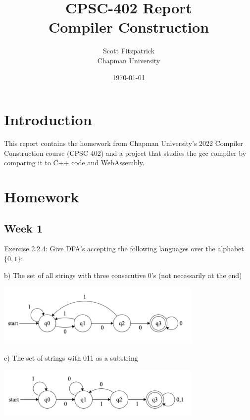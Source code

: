 \documentclass{article}
\title{CPSC-402 Report\\Compiler Construction}
\author{Scott Fitzpatrick  \\ Chapman University}
\date{\today}
\theoremstyle{theorem}
\theoremstyle{definition}
\theoremstyle{remark}
\begin{document}
\maketitle

\begin{abstract}

\end{abstract}

\tableofcontents


\section{Introduction}\label{intro}
\medskip
This report contains the homework from Chapman University's 2022 Compiler Construction course (CPSC 402) and a project that studies the gcc compiler by comparing it to C++ code and WebAssembly.

\section{Homework}\label{homework}

\subsection{Week 1}

\noindent
Exercise 2.2.4: Give DFA's accepting the following languages over the alphabet $\{0,1\}$:

\medskip\noindent
b) The set of all strings with three consecutive 0's (not necessarily at the end)

\begin{center}
\includegraphics[width=0.75\textwidth]{Images/2.4.4b.png}
\end{center}

\medskip\noindent
c) The set of strings with 011 as a substring

\begin{center}
\includegraphics[width=0.75\textwidth]{Images/2.4.4c.png}
\end{center}
\end{document}
